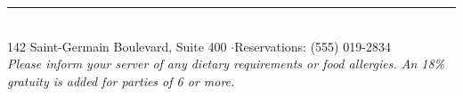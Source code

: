 \documentclass[10pt,a4paper]{article}
\begin{document}
\vfill

\begin{center}
  {\color{bordergold}\rule{0.45\linewidth}{0.5pt}}\\[4pt]
  {\small\color{bodytext} 142 Saint-Germain Boulevard, Suite 400 \quad$\cdot$\quad Reservations: (555) 019-2834}\\[2pt]
  {\scriptsize\itshape\color{bodytext} Please inform your server of any dietary requirements or food allergies. An 18\% gratuity is added for parties of 6 or more.}
\end{center}
\end{document}
